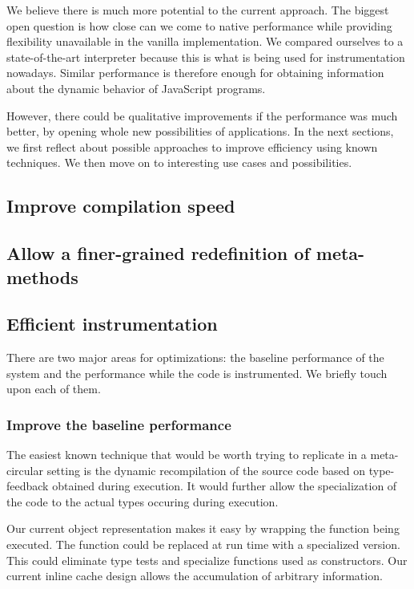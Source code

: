 We believe there is much more potential to the current approach. The
biggest open question is how close can we come to native performance while
providing flexibility unavailable in the vanilla implementation. We compared
ourselves to a state-of-the-art interpreter because this is what is being used
for instrumentation nowadays. Similar performance is therefore enough for
obtaining information about the dynamic behavior of JavaScript programs. 

However, there could be qualitative improvements if the performance was much
better, by opening whole new possibilities of applications.  In the next
sections, we first reflect about possible approaches to improve efficiency
using known techniques. We then move on to interesting use cases and
possibilities.

\subsection{Improve compilation speed}

\subsection{Allow a finer-grained redefinition of meta-methods}

\subsection{Efficient instrumentation}

There are two major areas for optimizations: the baseline performance of the
system and the performance while the code is instrumented. We briefly touch
upon each of them. 

\subsubsection{Improve the baseline performance}

The easiest known technique that would be worth trying to replicate in a
meta-circular setting is the dynamic recompilation of the source code based on
type-feedback obtained during execution. It would further allow the
specialization of the code to the actual types occuring during execution.

Our current object representation makes it easy by wrapping the function being
executed.  The function could be replaced at run time with a specialized
version. This could eliminate type tests and specialize functions used as
constructors. Our current inline cache design allows the accumulation of
arbitrary information.

